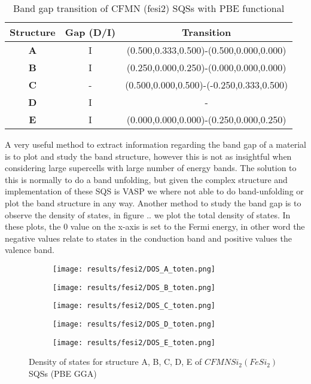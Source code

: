 \begin{table}[H]
\centering
\begin{tabular}{@{}ccc@{}}
\toprule
Structure  & Gap (D/I) & Transition                              \\ \midrule
\textbf{A} & I         & (0.500,0.333,0.500)-(0.500,0.000,0.000)  \\
\textbf{B} & I         & (0.250,0.000,0.250)-(0.000,0.000,0.000)  \\
\textbf{C} & -         & (0.500,0.000,0.500)-(-0.250,0.333,0.500) \\
\textbf{D} & I         & -                                        \\
\textbf{E} & I         & (0.000,0.000,0.000)-(0.250,0.000,0.250)  \\ \bottomrule
\end{tabular}
\caption{Band gap transition of CFMN (fesi2) SQSs with PBE functional}
\end{table}

A very useful method to extract information regarding the band gap of a material is to plot and study the band structure, however this is not as insightful when considering large supercells with large number of energy bands. The solution to this is normally to do a band unfolding, but given the complex structure and implementation of these SQS is VASP we where not able to do band-unfolding or plot the band structure in any way. Another method to study the band gap is to observe the density of states, in figure .. we plot the total density of states. In these plots, the 0 value on the x-axis is set to the Fermi energy, in other word the negative values relate to states in the conduction band and positive values the valence band. 

\begin{figure}[H]
	\centering
	\begin{subfigure}{0.9\textwidth}
		\texttt{[image: results/fesi2/DOS\_A\_toten.png]}
	\end{subfigure}

	\begin{subfigure}{0.9\textwidth}
		\texttt{[image: results/fesi2/DOS\_B\_toten.png]}
	\end{subfigure}
	\begin{subfigure}{0.9\textwidth}
		\texttt{[image: results/fesi2/DOS\_C\_toten.png]}
	\end{subfigure}
\end{figure}
\begin{figure}[H]
	\centering
	\begin{subfigure}{0.9\textwidth}
		\texttt{[image: results/fesi2/DOS\_D\_toten.png]}
	\end{subfigure}
	\begin{subfigure}{0.9\textwidth}
		\texttt{[image: results/fesi2/DOS\_E\_toten.png]}
	\end{subfigure}
	\caption{Density of states for structure A, B, C, D, E of $CFMNSi_2 (FeSi_2)$ SQSs (PBE GGA)}
	\label{dos_fesi2_gga}
\end{figure}

